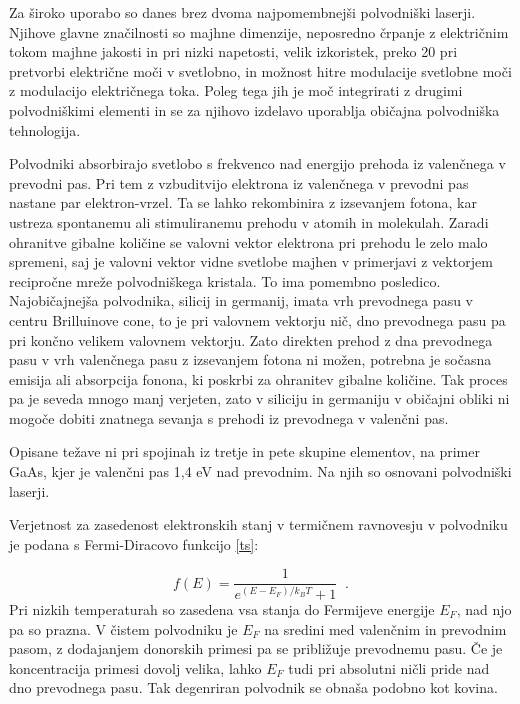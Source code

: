 Za široko uporabo so danes brez dvoma najpomembnejši polvodniški laserji.
Njihove glavne značilnosti so majhne dimenzije, neposredno črpanje z
električnim tokom majhne jakosti in pri nizki napetosti, velik izkoristek,
preko 20%
pri pretvorbi električne moči v svetlobno, in možnost hitre modulacije
svetlobne moči z modulacijo električnega toka. Poleg tega jih je moč
integrirati z drugimi polvodniškimi elementi in se za njihovo izdelavo
uporablja običajna polvodniška tehnologija.

Polvodniki absorbirajo svetlobo s frekvenco nad energijo prehoda iz
valenčnega v prevodni pas. Pri tem z vzbuditvijo elektrona iz valenčnega v
prevodni pas nastane par elektron-vrzel. Ta se lahko rekombinira z
izsevanjem fotona, kar ustreza spontanemu ali stimuliranemu prehodu v atomih
in molekulah. Zaradi ohranitve gibalne količine se valovni vektor elektrona
pri prehodu le zelo malo spremeni, saj je valovni vektor vidne svetlobe
majhen v primerjavi z vektorjem recipročne mreže polvodniškega kristala.
To ima pomembno posledico. Najobičajnejša polvodnika, silicij in germanij,
imata vrh prevodnega pasu v centru Brilluinove cone, to je pri valovnem
vektorju nič, dno prevodnega pasu pa pri končno velikem valovnem vektorju.
Zato direkten prehod z dna prevodnega pasu v vrh valenčnega pasu z
izsevanjem fotona ni možen, potrebna je sočasna emisija ali absorpcija
fonona, ki poskrbi za ohranitev gibalne količine. Tak proces pa je seveda
mnogo manj verjeten, zato v siliciju in germaniju v običajni obliki ni
mogoče dobiti znatnega sevanja s prehodi iz prevodnega v valenčni pas.

Opisane težave ni pri spojinah iz tretje in pete skupine elementov, na
primer GaAs, kjer je valenčni pas 1,4 eV nad prevodnim. Na njih so osnovani
polvodniški laserji.

Verjetnost za zasedenost elektronskih stanj v termičnem ravnovesju v
polvodniku je podana s Fermi-Diracovo funkcijo \ref{ts}:

\begin{equation}  \label{6.1}
f(E)=\frac{1}{e^{(E-E_F)/k_B T}+1}\;\;.
\end{equation}
Pri nizkih temperaturah so zasedena vsa stanja do Fermijeve energije $E_F$,
nad njo pa so prazna. V čistem polvodniku je $E_F$ na sredini med
valenčnim in prevodnim pasom, z dodajanjem donorskih primesi pa se
približuje prevodnemu pasu. Če je koncentracija primesi dovolj velika,
lahko $E_F$ tudi pri absolutni ničli pride nad dno prevodnega pasu. Tak
degenriran polvodnik se obnaša podobno kot kovina.

